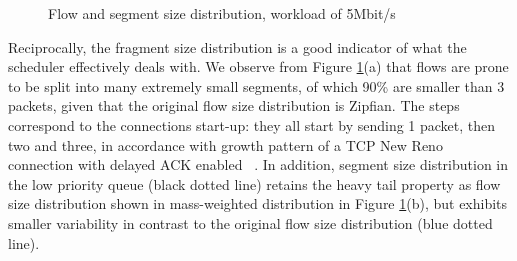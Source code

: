 \documentclass[preprint,12pt]{elsarticle}
\begin{document}
\begin{figure}[ht]
  \centering
  \caption{Flow and segment size distribution, workload of 5Mbit/s}
  \label{fig:flow_subflow}
\end{figure}

Reciprocally,  the  fragment size distribution is a good indicator of what the scheduler effectively deals with. 
We observe from Figure \ref{fig:flow_subflow}(a) that flows are prone to be split into many extremely small segments, of which 90\% are smaller than 3 packets, given that the original flow size distribution is Zipfian. The steps correspond to the connections start-up: they all start by sending 1 packet, then two and three, in accordance with growth pattern of  a TCP New Reno connection with delayed ACK enabled~\cite{Sikdar01analyticmodels} . In addition, segment size distribution in the low priority queue (black dotted line) retains the heavy tail property as flow size distribution shown in mass-weighted distribution in Figure \ref{fig:flow_subflow}(b), but exhibits smaller variability in contrast to the original flow size distribution (blue dotted line). 
\end{document}
